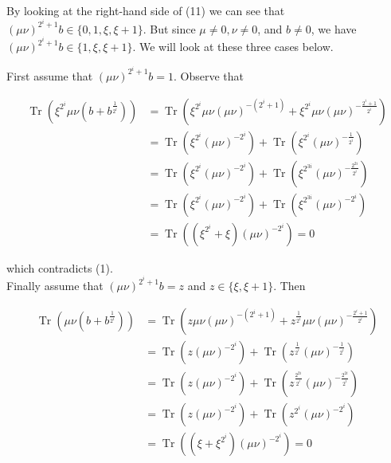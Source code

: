 \documentclass[10pt]{article}
\begin{document}
By looking at the right-hand side of (11) we can see that $(\mu \nu)^{2^{i}+1} b \in\{0,1, \xi, \xi+ 1\}$. But since $\mu \neq 0, \nu \neq 0$, and $b \neq 0$, we have $(\mu \nu)^{2^{i}+1} b \in\{1, \xi, \xi+1\}$. We will look at these three cases below.

First assume that $(\mu \nu)^{2^{i}+1} b=1$. Observe that

$$
\begin{aligned}
\operatorname{Tr}\left(\xi^{2^{i}} \mu \nu\left(b+b^{\frac{1}{2^{i}}}\right)\right) & =\operatorname{Tr}\left(\xi^{2^{i}} \mu \nu(\mu \nu)^{-\left(2^{i}+1\right)}+\xi^{2^{i}} \mu \nu(\mu \nu)^{-\frac{2^{i}+1}{2^{i}}}\right) \\
& =\operatorname{Tr}\left(\xi^{2^{i}}(\mu \nu)^{-2^{i}}\right)+\operatorname{Tr}\left(\xi^{2^{i}}(\mu \nu)^{-\frac{1}{2^{i}}}\right) \\
& =\operatorname{Tr}\left(\xi^{2^{i}}(\mu \nu)^{-2^{i}}\right)+\operatorname{Tr}\left(\xi^{2^{3 i}}(\mu \nu)^{-\frac{2^{2 i}}{2^{i}}}\right) \\
& =\operatorname{Tr}\left(\xi^{2^{i}}(\mu \nu)^{-2^{i}}\right)+\operatorname{Tr}\left(\xi^{2^{3 i}}(\mu \nu)^{-2^{i}}\right) \\
& =\operatorname{Tr}\left(\left(\xi^{2^{i}}+\xi\right)(\mu \nu)^{-2^{i}}\right)=0
\end{aligned}
$$

which contradicts (1).\\
Finally assume that $(\mu \nu)^{2^{i}+1} b=z$ and $z \in\{\xi, \xi+1\}$. Then

$$
\begin{aligned}
\operatorname{Tr}\left(\mu \nu\left(b+b^{\frac{1}{2^{i}}}\right)\right) & =\operatorname{Tr}\left(z \mu \nu(\mu \nu)^{-\left(2^{i}+1\right)}+z^{\frac{1}{2^{i}}} \mu \nu(\mu \nu)^{-\frac{2^{i}+1}{2^{i}}}\right) \\
& =\operatorname{Tr}\left(z(\mu \nu)^{-2^{i}}\right)+\operatorname{Tr}\left(z^{\frac{1}{2^{i}}}(\mu \nu)^{-\frac{1}{2^{i}}}\right) \\
& =\operatorname{Tr}\left(z(\mu \nu)^{-2^{i}}\right)+\operatorname{Tr}\left(z^{\frac{2^{2 i}}{2^{i}}}(\mu \nu)^{-\frac{2^{2 i}}{2^{i}}}\right) \\
& =\operatorname{Tr}\left(z(\mu \nu)^{-2^{i}}\right)+\operatorname{Tr}\left(z^{2^{i}}(\mu \nu)^{-2^{i}}\right) \\
& =\operatorname{Tr}\left(\left(\xi+\xi^{2^{i}}\right)(\mu \nu)^{-2^{i}}\right)=0
\end{aligned}
$$
\end{document}
